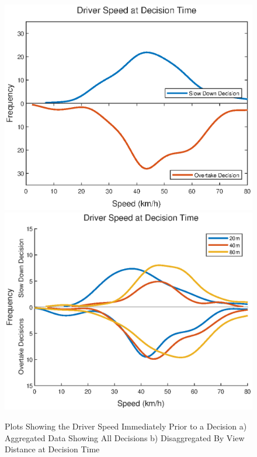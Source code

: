 \begin{figure}[H]
    \centering
    \includegraphics[width=0.37\paperwidth]{figures/Speed_Decision_Response.eps}\hfill
    \includegraphics[width=0.37\paperwidth]{figures/Speed_Decision_Response_by_view_Dist.eps}
    \caption{Plots Showing the Driver Speed Immediately Prior to a Decision a) Aggregated Data Showing All Decisions b) Disaggregated By View Distance at Decision Time}
    \label{fig:Speed_By_Decision}
\end{figure}